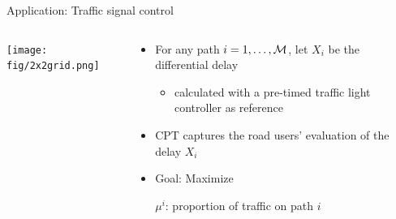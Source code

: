 \documentclass{beamer}
\begin{document}
\begin{frame}{Application: Traffic signal control}
\begin{columns}
	\begin{column}{0.4\textwidth}
	        \texttt{[image: fig/2x2grid.png]}
	\end{column}
	\begin{column}{0.53\textwidth}
	\begin{small}
	\begin{itemize}
		\item For any path $i=1,\ldots,{\mathcal{M}}$, let $X_i$ be the differential delay 
		\begin{itemize}
			\item {\scriptsize calculated with a pre-timed traffic light controller as reference}
		\end{itemize} 
		\item CPT captures the road users' evaluation of the delay $X_i$
		\item Goal: Maximize 
				
				$\mu^i$: proportion of traffic on path $i$
	\end{itemize}
	\end{small}
	\end{column}
\end{columns}

\end{frame}
\end{document}
